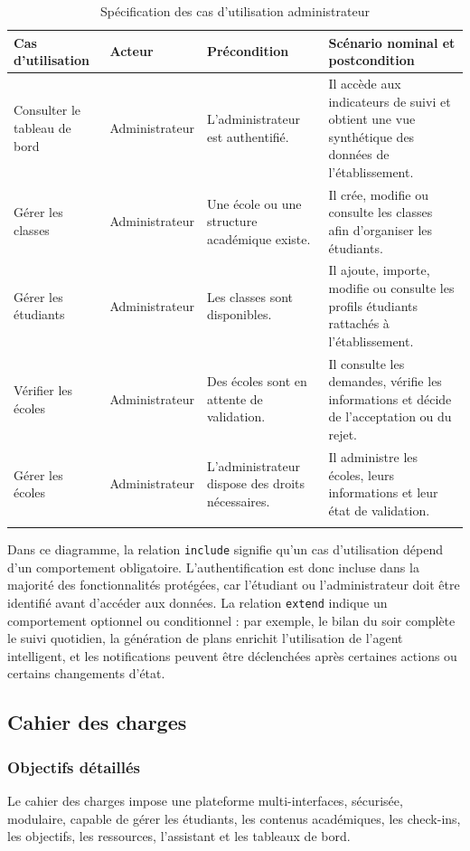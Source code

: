 \documentclass{rapportENSET}
\begin{document}
\begin{longtable}{@{}L{0.22\textwidth}L{0.18\textwidth}L{0.25\textwidth}L{0.25\textwidth}@{}}
\toprule
\textbf{Cas d'utilisation} & \textbf{Acteur} & \textbf{Précondition} & \textbf{Scénario nominal et postcondition} \\
\midrule
\endhead
Consulter le tableau de bord & Administrateur & L'administrateur est authentifié. & Il accède aux indicateurs de suivi et obtient une vue synthétique des données de l'établissement. \\
Gérer les classes & Administrateur & Une école ou une structure académique existe. & Il crée, modifie ou consulte les classes afin d'organiser les étudiants. \\
Gérer les étudiants & Administrateur & Les classes sont disponibles. & Il ajoute, importe, modifie ou consulte les profils étudiants rattachés à l'établissement. \\
Vérifier les écoles & Administrateur & Des écoles sont en attente de validation. & Il consulte les demandes, vérifie les informations et décide de l'acceptation ou du rejet. \\
Gérer les écoles & Administrateur & L'administrateur dispose des droits nécessaires. & Il administre les écoles, leurs informations et leur état de validation. \\
\bottomrule
\caption{Spécification des cas d'utilisation administrateur}
\end{longtable}

Dans ce diagramme, la relation \texttt{include} signifie qu'un cas d'utilisation dépend d'un comportement obligatoire. L'authentification est donc incluse dans la majorité des fonctionnalités protégées, car l'étudiant ou l'administrateur doit être identifié avant d'accéder aux données. La relation \texttt{extend} indique un comportement optionnel ou conditionnel : par exemple, le bilan du soir complète le suivi quotidien, la génération de plans enrichit l'utilisation de l'agent intelligent, et les notifications peuvent être déclenchées après certaines actions ou certains changements d'état.

\subsection{Cahier des charges}
\subsubsection*{Objectifs détaillés}
Le cahier des charges impose une plateforme multi-interfaces, sécurisée, modulaire, capable de gérer les étudiants, les contenus académiques, les check-ins, les objectifs, les ressources, l'assistant et les tableaux de bord.
\end{document}
